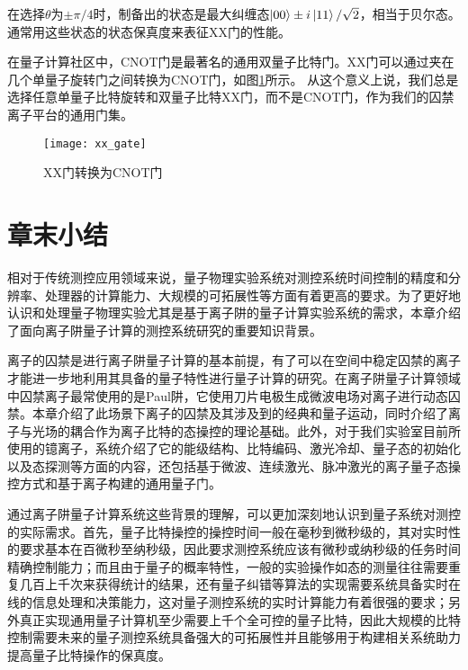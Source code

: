 在选择$\theta$为$\pm\pi/4$时，制备出的状态是最大纠缠态$\ket{00}\pm i\ket{11}/\sqrt{2}$，相当于贝尔态。通常用这些状态的状态保真度来表征XX门的性能。

在量子计算社区中，CNOT门是最著名的通用双量子比特门。XX门可以通过夹在几个单量子旋转门之间转换为CNOT门\cite[]{Debnath_Linke_Figgatt_Landsman_Wright_Monroe_2016}，如图\ref{fig:xx_gate}所示。
从这个意义上说，我们总是选择任意单量子比特旋转和双量子比特XX门，而不是CNOT门，作为我们的囚禁离子平台的通用门集。


\begin{figure}
    \centering
    \caption[XX门转换为CNOT门]{XX门转换为CNOT门\label{fig:xx_gate}}
    \texttt{[image: xx\_gate]}
\end{figure}

\newpage
\section[章末小结]{章末小结}

相对于传统测控应用领域来说，量子物理实验系统对测控系统时间控制的精度和分辨率、处理器的计算能力、大规模的可拓展性等方面有着更高的要求。为了更好地认识和处理量子物理实验尤其是基于离子阱的量子计算实验系统的需求，本章介绍了面向离子阱量子计算的测控系统研究的重要知识背景。

离子的囚禁是进行离子阱量子计算的基本前提，有了可以在空间中稳定囚禁的离子才能进一步地利用其具备的量子特性进行量子计算的研究。在离子阱量子计算领域中囚禁离子最常使用的是Paul阱，它使用刀片电极生成微波电场对离子进行动态囚禁。本章介绍了此场景下离子的囚禁及其涉及到的经典和量子运动，同时介绍了离子与光场的耦合作为离子比特的态操控的理论基础。此外，对于我们实验室目前所使用的镱离子，系统介绍了它的能级结构、比特编码、激光冷却、量子态的初始化以及态探测等方面的内容，还包括基于微波、连续激光、脉冲激光的离子量子态操控方式和基于离子构建的通用量子门。

通过离子阱量子计算系统这些背景的理解，可以更加深刻地认识到量子系统对测控的实际需求。首先，量子比特操控的操控时间一般在毫秒到微秒级的，其对实时性的要求基本在百微秒至纳秒级，因此要求测控系统应该有微秒或纳秒级的任务时间精确控制能力；而且由于量子的概率特性，一般的实验操作如态的测量往往需要重复几百上千次来获得统计的结果，还有量子纠错等算法的实现需要系统具备实时在线的信息处理和决策能力，这对量子测控系统的实时计算能力有着很强的要求；另外真正实现通用量子计算机至少需要上千个全可控的量子比特，因此大规模的比特控制需要未来的量子测控系统具备强大的可拓展性并且能够用于构建相关系统助力提高量子比特操作的保真度。








